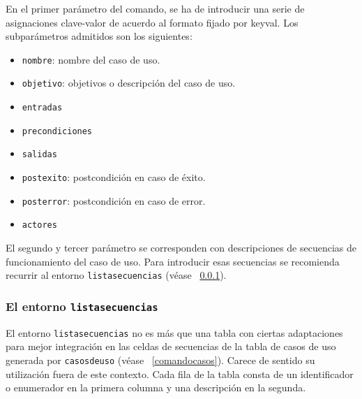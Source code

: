 \documentclass[draft]{ltxdoc}
\begin{document}
	En el primer parámetro del comando, se ha de introducir una serie de asignaciones clave-valor de acuerdo al formato
fijado por \textsf{keyval}. Los subparámetros admitidos son los siguientes:
	\begin{multicols}{2}
		\begin{itemize}
			\item \verb|nombre|: nombre del caso de uso.
			\item \verb|objetivo|: objetivos o descripción del caso de uso.
			\item \verb|entradas|
			\item \verb|precondiciones|
			\item \verb|salidas|
			\item \verb|postexito|: postcondición en caso de éxito.
			\item \verb|posterror|: postcondición en caso de error.
			\item \verb|actores|
		\end{itemize}
	\end{multicols}

	El segundo y tercer parámetro se corresponden con descripciones de secuencias de funcionamiento del caso de uso. Para introducir esas secuencias se recomienda recurrir al entorno \verb|listasecuencias| (véase ~\ref{entornosecuencias}).

\subsubsection{El entorno \texttt{listasecuencias}} \label{entornosecuencias}
	El entorno \verb|listasecuencias| no es más que una tabla con ciertas adaptaciones para mejor integración en las celdas de secuencias de la tabla de casos de uso generada por \verb|casosdeuso| (véase ~\ref{comandocasos}). Carece de sentido su utilización fuera de este contexto. Cada fila de la tabla consta de un identificador o enumerador en la primera columna y una descripción en la segunda.
\end{document}

